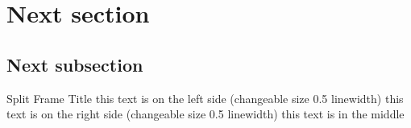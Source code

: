 \section{Next section}
\subsection{Next subsection}

\begin{splitframe}{0.5}{0.5}{Split Frame Title}
{this text is on the left side (changeable size 0.5 linewidth)}
{this text is on the right side (changeable size 0.5 linewidth)}
this text is in the middle
\end{splitframe}
